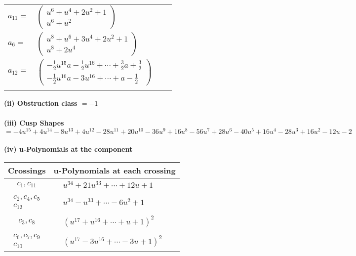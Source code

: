 \documentclass[1p]{elsarticle_modified}
\theoremstyle{definition}
\begin{document}
\begin{tabular}{m{7pt} m{180pt} m{7pt} m{180pt} }
\flushright $a_{11}=$&$\begin{pmatrix}u^6+u^4+2 u^2+1\\u^6+u^2\end{pmatrix}$ \\
\flushright $a_{6}=$&$\begin{pmatrix}u^8+u^6+3 u^4+2 u^2+1\\u^8+2 u^4\end{pmatrix}$ \\
\flushright $a_{12}=$&$\begin{pmatrix}-\frac{1}{2} u^{15} a-\frac{1}{2} u^{16}+\cdots+\frac{3}{2} a+\frac{3}{2}\\-\frac{1}{2} u^{16} a-3 u^{16}+\cdots+a-\frac{1}{2}\end{pmatrix}$\\&\end{tabular}
\flushleft \textbf{(ii) Obstruction class $= -1$}\\~\\
\flushleft \textbf{(iii) Cusp Shapes $= -4 u^{15}+4 u^{14}-8 u^{13}+4 u^{12}-28 u^{11}+20 u^{10}-36 u^9+16 u^8-56 u^7+28 u^6-40 u^5+16 u^4-28 u^3+16 u^2-12 u-2$}\\~\\
\newpage\renewcommand{\arraystretch}{1}
\flushleft \textbf{(iv) u-Polynomials at the component}\newline \\
\begin{tabular}{m{50pt}|m{274pt}}
Crossings & \hspace{64pt}u-Polynomials at each crossing \\
\hline $$\begin{aligned}c_{1},c_{11}\end{aligned}$$&$\begin{aligned}
&u^{34}+21 u^{33}+\cdots+12 u+1
\end{aligned}$\\
\hline $$\begin{aligned}c_{2},c_{4},c_{5}\\c_{12}\end{aligned}$$&$\begin{aligned}
&u^{34}- u^{33}+\cdots-6 u^2+1
\end{aligned}$\\
\hline $$\begin{aligned}c_{3},c_{8}\end{aligned}$$&$\begin{aligned}
&(u^{17}+u^{16}+\cdots+u+1)^{2}
\end{aligned}$\\
\hline $$\begin{aligned}c_{6},c_{7},c_{9}\\c_{10}\end{aligned}$$&$\begin{aligned}
&(u^{17}-3 u^{16}+\cdots-3 u+1)^{2}
\end{aligned}$\\
\hline
\end{tabular}\\~\\
\end{document}
